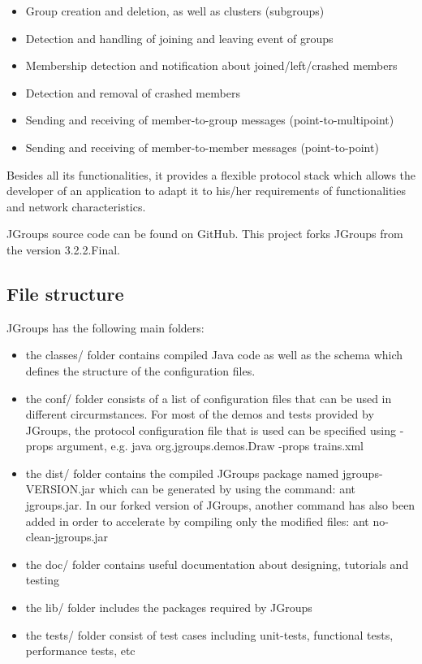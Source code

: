 \documentclass[a4paper,10pt]{report}
\begin{document}
\begin{itemize}
\item     Group creation and deletion, as well as clusters (subgroups)
\item     Detection and handling of joining and leaving event of groups
\item     Membership detection and notification about joined/left/crashed members
\item     Detection and removal of crashed members
\item     Sending and receiving of member-to-group messages (point-to-multipoint)
\item      Sending and receiving of member-to-member messages (point-to-point)
\end{itemize}        

Besides all its functionalities, it provides a flexible protocol stack which allows the developer of an application to adapt it to his/her requirements of functionalities and network characteristics\cite{jgroups}.

JGroups source code can be found on GitHub. This project forks JGroups from the version 3.2.2.Final.

\subsection{File structure}
JGroups has the following main folders:
\begin{itemize}
\item the classes/ folder contains compiled Java code as well as the schema which defines the structure of the configuration files.
\item the conf/ folder consists of a list of configuration files that can be used in different circurmstances. For most of the demos and tests provided by JGroups, the protocol configuration file that is used can be specified using -props argument, e.g. 
java org.jgroups.demos.Draw -props trains.xml
\item the dist/ folder contains the compiled JGroups package named jgroups-VERSION.jar which can be generated by using the command: ant jgroups.jar. In our forked version of JGroups, another command has also been added in order to accelerate by compiling only the modified files: ant no-clean-jgroups.jar
\item the doc/ folder contains useful documentation about designing, tutorials and testing
\item the lib/ folder includes the packages required by JGroups
\item the tests/ folder consist of test cases including unit-tests, functional tests, performance tests, etc
\end{itemize}
\end{document}
